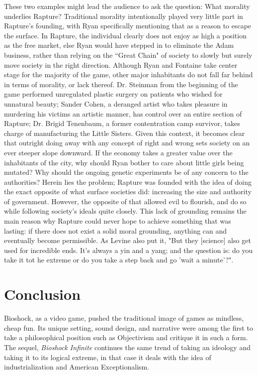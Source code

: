 \documentclass{article}
\begin{document}
These two examples might lead the audience to ask the question: What morality underlies Rapture? Traditional 
morality intentionally played very little part in Rapture's founding, with Ryan specifically mentioning that
as a reason to escape the surface. In Rapture, the individual clearly does not enjoy as high a position as 
the free market, else Ryan would have stepped in to eliminate the Adam business, rather than relying on the 
``Great Chain" of society to slowly but surely move society in the right direction. Although Ryan and 
Fontaine take center stage for the majority of the game, other major inhabitants do not fall far behind 
in terms of morality, or lack thereof. Dr. Steinman from the beginning of the game performed unregulated
plastic surgery on patients who wished for unnatural beauty; Sander Cohen, a deranged artist who takes pleasure
in murdering his victims an artistic manner, has control over an entire section of Rapture; 
Dr. Brigid Tenenbaum, a former contentration
camp survivor, takes charge of manufacturing the Little Sisters. Given this context, it becomes clear that 
outright doing away with any concept of right and wrong sets society on an ever steeper slope downward. If 
the economy takes a greater value over the inhabitants of the city, why should Ryan bother to care about little 
girls being mutated? Why should the ongoing genetic experiments be of any concern to the authorities? Herein
lies the problem; Rapture was founded with the idea of doing the exact opposite of what surface societies did:
increasing the size and authority of government. However, the opposite of that allowed evil to flourish, and do
so while following society's ideals quite closely. This lack of grounding remains the main reason why Rapture
could never hope to achieve something that was lasting: if there does not exist a solid moral grounding,
anything can and eventually become permissible. As Levine also put it, "But they [science] also get used for 
incredible ends. It's always a yin and a yang; and the question is: do you take it tot he extreme or do you take 
a step back and go 'wait a minute'?"\textcite{LevineInterview}. 

\section{Conclusion}
Bioshock, as a video game, pushed the traditional image of games as mindless, cheap fun. Its unique setting,
sound design, and narrative were among the first to take a philosophical position such as Objectivism and 
critique it in such a form. The sequel, \textit{Bioshock Infinite} continues the same trend of taking 
an ideology and taking it to its logical extreme, in that case it deals with the idea of industrialization and
American Exceptionalism. 
\end{document}
